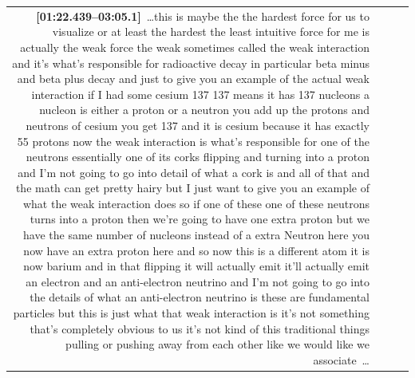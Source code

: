 \documentclass[10pt]{article}
\begin{document}
\begin{tiny}
\begin{longtable}{r p{0.3in} p{1.212in} p{3.8in}}
                                                                                                                                                                                                                                                                                               \textbf{[01:22.439--03:05.1]}~\ldots this is maybe the the hardest force for us to visualize or at least the hardest the least intuitive force for me is actually the weak force the weak sometimes called the weak interaction and it's what's responsible for radioactive decay in particular beta minus and beta plus decay and just to give you an example of the actual weak interaction if I had some cesium 137 137 means it has 137 nucleons a nucleon is either a proton or a neutron you add up the protons and neutrons of cesium you get 137 and it is cesium because it has exactly 55 protons now the weak interaction is what's responsible for one of the neutrons essentially one of its corks flipping and turning into a proton and I'm not going to go into detail of what a cork is and all of that and the math can get pretty hairy but I just want to give you an example of what the weak interaction does so if one of these one of these neutrons turns into a proton then we're going to have one extra proton but we have the same number of nucleons instead of a extra Neutron here you now have an extra proton here and so now this is a different atom it is now barium and in that flipping it will actually emit it'll actually emit an electron and an anti-electron neutrino and I'm not going to go into the details of what an anti-electron neutrino is these are fundamental particles but this is just what that weak interaction is it's not something that's completely obvious to us it's not kind of this traditional things pulling or pushing away from each other like we would like we associate~\ldots \\

\end{longtable}
\end{tiny}
\end{document}
